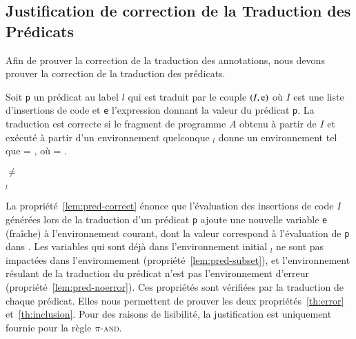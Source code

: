 \subsection{Justification de correction de la Traduction des Prédicats}
\label{sec:predicate-translation}


Afin de prouver la correction de la traduction des annotations,
nous devons prouver la correction de la traduction des prédicats.

\begin{myproperty}
  \label{lem:pred-correct}
  Soit \lstinline'p' un prédicat au label $l$ qui est
  traduit par le couple $(I, \mbox{\lstinline'e'})$ où $I$ est une liste
  d'insertions de code et \lstinline'e' l'expression donnant la valeur du
  prédicat \lstinline'p'.
  La traduction est correcte si le fragment de programme $A$ obtenu à partir de
  $I$ et exécuté à partir d'un environnement quelconque \env$_l$ donne un
  environnement \env{} tel que
   = , où
  \env = .
\end{myproperty}

\begin{myproperty}
  \label{lem:pred-noerror}
  \env $\neq$ \errorenv
\end{myproperty}

\begin{myproperty}
  \label{lem:pred-subset}
  \env$_l$ \subenv{} \env
\end{myproperty}

La propriété~\ref{lem:pred-correct} énonce que l'évaluation des insertions de
code
$I$ générées lors de la traduction d'un prédicat \lstinline'p' ajoute une
nouvelle variable \lstinline'e' (fraîche) à l'environnement courant, dont la
valeur correspond à l'évaluation de \lstinline'p' dans \env.
Les variables qui sont déjà dans l'environnement initial \env$_l$ ne sont pas
impactées dans l'environnement \env{} (propriété~\ref{lem:pred-subset}), et
l'environnement résulant de la traduction du prédicat n'est pas l'environnement
d'erreur \errorenv (propriété~\ref{lem:pred-noerror}).
Ces propriétés sont vérifiées par la traduction de chaque prédicat.
Elles nous permettent de prouver les deux propriétés~\ref{th:error}
et~\ref{th:inclusion}.
Pour des raisons de lisibilité, la justification est uniquement fournie pour la
règle \textsc{$\pi$-and}.%


